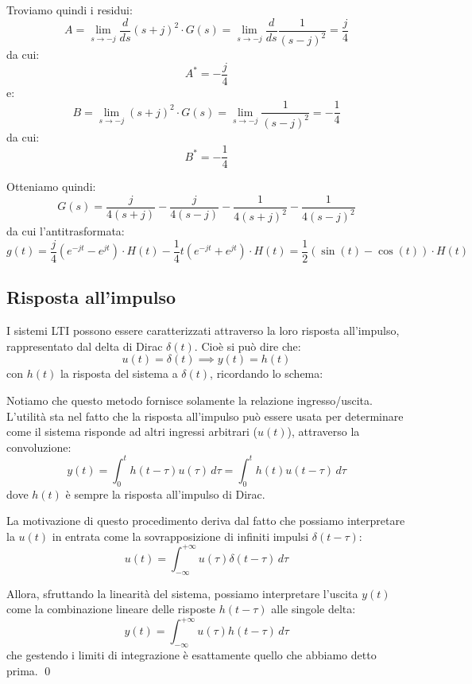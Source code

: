 \documentclass[a4paper,11pt]{article}
\begin{document}
Troviamo quindi i residui:
$$
A = \lim_{s \rightarrow -j} \frac{d}{ds} (s + j)^2 \cdot G(s) = \lim_{s \rightarrow -j} \frac{d}{ds} \frac{1}{(s - j)^2} = \frac{j}{4}
$$
da cui:
$$
A^* = -\frac{j}{4}
$$
e:
$$
B = \lim_{s \rightarrow -j}  (s + j)^2 \cdot G(s) = \lim_{s \rightarrow -j}  \frac{1}{(s - j)^2} = -\frac{1}{4}
$$
da cui:
$$
B^* = -\frac{1}{4}
$$

Otteniamo quindi:
$$
G(s) = \frac{j}{4(s + j)} - \frac{j}{4(s - j)} - \frac{1}{4(s + j)^2} - \frac{1}{4(s - j)^2}
$$
da cui l'antitrasformata:
$$
g(t) = \frac{j}{4} \left( e^{-jt} - e^{jt} \right) \cdot H(t) - \frac{1}{4}t \left( e^{-jt} + e^{jt} \right) \cdot H(t) = \frac{1}{2} \left( \sin(t) - \cos(t) \right) \cdot H(t) 
$$

\subsection{Risposta all'impulso}
I sistemi LTI possono essere caratterizzati attraverso la loro risposta all'impulso, rappresentato dal delta di Dirac $\delta(t)$.
Cioè si può dire che:
$$
u(t) = \delta(t) \implies y(t) = h(t)
$$
con $h(t)$ la risposta del sistema a $\delta(t)$, ricordando lo schema:

\begin{center}
\end{center}

Notiamo che questo metodo fornisce solamente la relazione ingresso/uscita.
L'utilità sta nel fatto che la risposta all'impulso può essere usata per determinare come il sistema risponde ad altri ingressi arbitrari ($u(t)$), attraverso la convoluzione:
$$
y(t) =\int_0^t h(t - \tau) u(\tau) \, d\tau = \int_0^t h(t) u(t - \tau) \, d\tau
$$
dove $h(t)$ è sempre la risposta all'impulso di Dirac.

La motivazione di questo procedimento deriva dal fatto che possiamo interpretare la $u(t)$ in entrata come la sovrapposizione di infiniti impulsi $\delta (t - \tau)$:
$$
u(t) = \int_{-\infty}^{+\infty} u(\tau) \delta(t - \tau) \, d\tau
$$

Allora, sfruttando la linearità del sistema, possiamo interpretare l'uscita $y(t)$ come la combinazione lineare delle risposte $h(t - \tau)$ alle singole delta:
$$
y(t) = \int_{-\infty}^{+\infty} u(\tau) h(t - \tau) \, d\tau
$$
che gestendo i limiti di integrazione è esattamente quello che abbiamo detto prima. \qed
\end{document}
